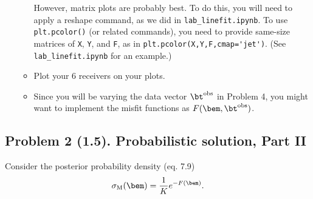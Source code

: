 \documentclass[11pt,titlepage,fleqn]{article}
\begin{document}
\begin{enumerate}
\begin{itemize}
However, matrix plots are probably best. To do this, you will need to apply a reshape command, as we did in \verb+lab_linefit.ipynb+.  To use \verb+plt.pcolor()+ (or related commands), you need to provide same-size matrices of \verb+X+, \verb+Y+, and \verb+F+, as in \verb+plt.pcolor(X,Y,F,cmap='jet')+. (See \verb+lab_linefit.ipynb+ for an example.)

\item Plot your 6 receivers on your plots. 

\item Since you will be varying the data vector $\bt^{\rm obs}$ in Problem 4, you might want to implement the misfit functions as $F(\bem,\bt^{\rm obs})$.

\end{itemize}

\end{enumerate}


\pagebreak
\subsection*{Problem 2 (1.5). Probabilistic solution, Part II}

Consider the posterior probability density (eq. 7.9)
%
\begin{equation}
\sigma_{\rm M}(\bem) = \frac{1}{K} e^{-F(\bem)}.
\end{equation}
\end{document}
